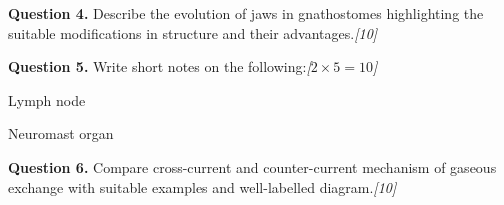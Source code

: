 \documentclass[11pt,a4paper]{article}
\newcommand{\pts}[1]{\hfill   \textit{[#1]}}
\begin{document}
\pagebreak

\medskip


\noindent   \textbf{Question 4.} Describe the evolution of jaws in gnathostomes highlighting the suitable modifications in structure and their advantages.\pts{10}

\medskip


\noindent   \textbf{Question 5.} Write short notes on the following:\pts{$2  \times 5 = 10$}

\begin{parts}
  \item Lymph node
  \item Neuromast organ
\end{parts}

\medskip


\noindent   \textbf{Question 6.} Compare cross-current and counter-current mechanism of gaseous exchange with suitable examples and well-labelled diagram.\pts{10}
\end{document}
